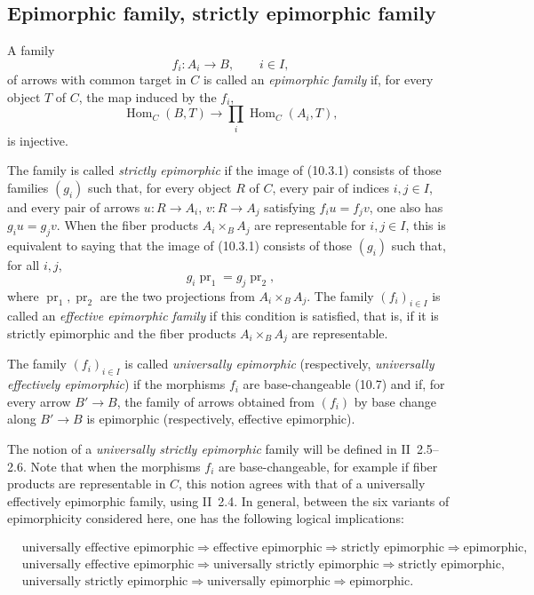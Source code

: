 \documentclass[11pt]{article}
\newcommand{\Hom}{\operatorname{Hom}}
\newcommand{\pr}{\operatorname{pr}}
\begin{document}
\subsection{Epimorphic family, strictly epimorphic family}

A family
\[
 f_i:A_i\longrightarrow B,\qquad i\in I,
\]
of arrows with common target in \(C\) is called an \emph{epimorphic family} if, for every object \(T\) of \(C\), the map induced by the \(f_i\),
\begin{equation}
 \Hom_C(B,T)\longrightarrow \prod_i \Hom_C(A_i,T),
 \tag{10.3.1}
\end{equation}
is injective.

The family is called \emph{strictly epimorphic} if the image of (10.3.1) consists of those families \((g_i)\) such that, for every object \(R\) of \(C\), every pair of indices \(i,j\in I\), and every pair of arrows \(u:R\to A_i\), \(v:R\to A_j\) satisfying \(f_i u=f_jv\), one also has \(g_i u=g_jv\). When the fiber products \(A_i\times_B A_j\) are representable for \(i,j\in I\), this is equivalent to saying that the image of (10.3.1) consists of those \((g_i)\) such that, for all \(i,j\),
\[
 g_i\pr_1=g_j\pr_2,
\]
where \(\pr_1,\pr_2\) are the two projections from \(A_i\times_B A_j\). The family \((f_i)_{i\in I}\) is called an \emph{effective epimorphic family} if this condition is satisfied, that is, if it is strictly epimorphic and the fiber products \(A_i\times_B A_j\) are representable.

The family \((f_i)_{i\in I}\) is called \emph{universally epimorphic} (respectively, \emph{universally effectively epimorphic}) if the morphisms \(f_i\) are base-changeable (10.7) and if, for every arrow \(B'\to B\), the family of arrows obtained from \((f_i)\) by base change along \(B'\to B\) is epimorphic (respectively, effective epimorphic).

The notion of a \emph{universally strictly epimorphic} family will be defined in II~2.5--2.6. Note that when the morphisms \(f_i\) are base-changeable, for example if fiber products are representable in \(C\), this notion agrees with that of a universally effectively epimorphic family, using II~2.4. In general, between the six variants of epimorphicity considered here, one has the following logical implications:


\[
\begin{aligned}
&\text{universally effective epimorphic}\Rightarrow\text{effective epimorphic}\Rightarrow\text{strictly epimorphic}\Rightarrow\text{epimorphic},\\
&\text{universally effective epimorphic}\Rightarrow\text{universally strictly epimorphic}\Rightarrow\text{strictly epimorphic},\\
&\text{universally strictly epimorphic}\Rightarrow\text{universally epimorphic}\Rightarrow\text{epimorphic}.
\end{aligned}
\]
\end{document}
